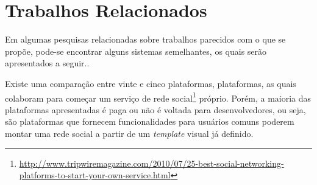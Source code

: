 \section{Trabalhos Relacionados}

Em algumas pesquisas relacionadas sobre trabalhos parecidos com o que se propõe, pode-se encontrar alguns sistemas semelhantes, os quais serão apresentados a seguir..

Existe uma comparação entre vinte e cinco plataformas, plataformas, as quais colaboram para começar um serviço de rede social\footnote{\url{http://www.tripwiremagazine.com/2010/07/25-best-social-networking-platforms-to-start-your-own-service.html}}  próprio. Porém, a  maioria das plataformas apresentadas é paga ou não é voltada para desenvolvedores, ou seja, são plataformas que fornecem funcionalidades para usuários comuns poderem montar uma rede social a partir de um \textit{template} visual já definido.

\newpage

